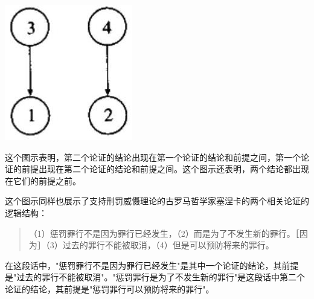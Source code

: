 \begin{center}
\includegraphics[width=\textwidth]{images/2025_05_15_6a28331d5e7c993ad07ag-035.jpg}
\end{center}

这个图示表明，第二个论证的结论出现在第一个论证的结论和前提之间，第一个论证的前提出现在第二个论证的结论和前提之间。这个图示还表明，两个结论都出现在它们的前提之前。

这个图示同样也展示了支持刑罚威慑理论的古罗马哲学家塞涅卡的两个相关论证的逻辑结构：
\begin{quotation}
（1）惩罚罪行不是因为罪行已经发生，（2）而是为了不发生新的罪行。［因为］（3）过去的罪行不能被取消，（4）但是可以预防将来的罪行。
\end{quotation}

在这段话中，"惩罚罪行不是因为罪行已经发生"是其中一个论证的结论，其前提是"过去的罪行不能被取消"。"惩罚罪行是为了不发生新的罪行"是这段话中第二个论证的结论，其前提是"惩罚罪行可以预防将来的罪行"。

